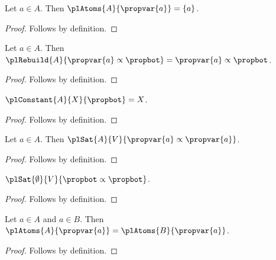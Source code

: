

\begin{proposition}\label{pl_atoms_atom_example}
    Let $a\in A$.
    Then $\plAtoms{A}{\propvar{a}}=\{a\}$.
\end{proposition}
\begin{proof}
    Follows by definition.
\end{proof}

\begin{proposition}\label{pl_rebuild_small}
    Let $a\in A$.
    Then $\plRebuild{A}{\propvar{a}\propto\propbot}=\propvar{a}\propto\propbot$.
\end{proposition}
\begin{proof}
    Follows by definition.
\end{proof}

\begin{proposition}\label{pl_constant_small}
    $\plConstant{A}{X}{\propbot}=X$.
\end{proposition}
\begin{proof}
    Follows by definition.
\end{proof}

\begin{proposition}\label{pl_satisfaction_reflexive}
    Let $a\in A$.
    Then $\plSat{A}{V}{\propvar{a}\propto\propvar{a}}$.
\end{proposition}
\begin{proof}
    Follows by definition.
\end{proof}

\begin{proposition}\label{pl_satisfaction_empty}
    $\plSat{\emptyset}{V}{\propbot\propto\propbot}$.
\end{proposition}
\begin{proof}
    Follows by definition.
\end{proof}

\begin{proposition}\label{pl_atoms_two_carriers}
    Let $a\in A$ and $a\in B$.
    Then $\plAtoms{A}{\propvar{a}}=\plAtoms{B}{\propvar{a}}$.
\end{proposition}
\begin{proof}
    Follows by definition.
\end{proof}

